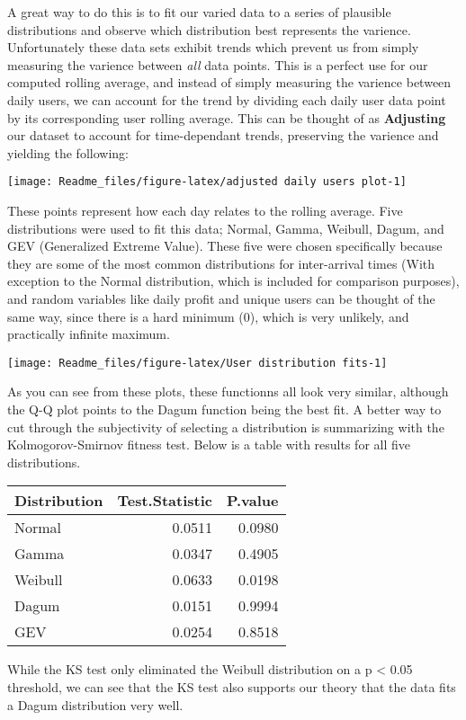 \documentclass[]{article}
\begin{document}
A great way to do this is to fit our varied data to a series of
plausible distributions and observe which distribution best represents
the varience. Unfortunately these data sets exhibit trends which prevent
us from simply measuring the varience between \emph{all} data points.
This is a perfect use for our computed rolling average, and instead of
simply measuring the varience between daily users, we can account for
the trend by dividing each daily user data point by its corresponding
user rolling average. This can be thought of as \textbf{Adjusting} our
dataset to account for time-dependant trends, preserving the varience
and yielding the following:

\begin{center}\texttt{[image: Readme\_files/figure-latex/adjusted daily users plot-1]} \end{center}

These points represent how each day relates to the rolling average. Five
distributions were used to fit this data; Normal, Gamma, Weibull, Dagum,
and GEV (Generalized Extreme Value). These five were chosen specifically
because they are some of the most common distributions for inter-arrival
times (With exception to the Normal distribution, which is included for
comparison purposes), and random variables like daily profit and unique
users can be thought of the same way, since there is a hard minimum (0),
which is very unlikely, and practically infinite maximum.

\begin{center}\texttt{[image: Readme\_files/figure-latex/User distribution fits-1]} \end{center}

As you can see from these plots, these functionns all look very similar,
although the Q-Q plot points to the Dagum function being the best fit. A
better way to cut through the subjectivity of selecting a distribution
is summarizing with the Kolmogorov-Smirnov fitness test. Below is a
table with results for all five distributions.

\begin{longtable}[]{@{}lrr@{}}
\toprule
Distribution & Test.Statistic & P.value\tabularnewline
\midrule
\endhead
Normal & 0.0511 & 0.0980\tabularnewline
Gamma & 0.0347 & 0.4905\tabularnewline
Weibull & 0.0633 & 0.0198\tabularnewline
Dagum & 0.0151 & 0.9994\tabularnewline
GEV & 0.0254 & 0.8518\tabularnewline
\bottomrule
\end{longtable}

While the KS test only eliminated the Weibull distribution on a p
\textless{} 0.05 threshold, we can see that the KS test also supports
our theory that the data fits a Dagum distribution very well.
\end{document}
